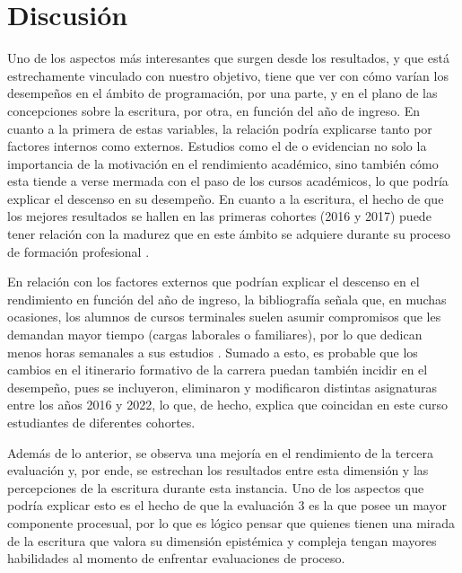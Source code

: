 \documentclass[spanish]{textolivre}
\begin{document}
\section{Discusión}
Uno de los aspectos más interesantes que surgen desde los resultados, y que está estrechamente vinculado con nuestro objetivo, tiene que ver con cómo varían los desempeños en el ámbito de programación, por una parte, y en el plano de las concepciones sobre la escritura, por otra, en función del año de ingreso. En cuanto a la primera de estas variables, la relación podría explicarse tanto por factores internos como externos. Estudios como el de \textcite{perez2005evolucion} o \textcite{garcia2021transformacion} evidencian no solo la importancia de la motivación en el rendimiento académico, sino también cómo esta tiende a verse mermada con el paso de los cursos académicos, lo que podría explicar el descenso en su desempeño. En cuanto a la escritura, el hecho de que los mejores resultados se hallen en las primeras cohortes (2016 y 2017) puede tener relación con la madurez que en este ámbito se adquiere durante su proceso de formación profesional \cite{valdesleon2022errores}.

En relación con los factores externos que podrían explicar el descenso en el rendimiento en función del año de ingreso, la bibliografía señala que, en muchas ocasiones, los alumnos de cursos terminales suelen asumir compromisos que les demandan mayor tiempo (cargas laborales o familiares), por lo que dedican menos horas semanales a sus estudios \cite{alcover2007analisis, xavier2022persistence}. Sumado a esto, es probable que los cambios en el itinerario formativo de la carrera puedan también incidir en el desempeño, pues se incluyeron, eliminaron y modificaron distintas asignaturas entre los años 2016 y 2022, lo que, de hecho, explica que coincidan en este curso estudiantes de diferentes cohortes.

Además de lo anterior, se observa una mejoría en el rendimiento de la tercera evaluación y, por ende, se estrechan los resultados entre esta dimensión y las percepciones de la escritura durante esta instancia. Uno de los aspectos que podría explicar esto es el hecho de que la evaluación 3 es la que posee un mayor componente procesual, por lo que es lógico pensar que quienes tienen una mirada de la escritura que valora su dimensión  epistémica y compleja tengan mayores habilidades al momento de enfrentar evaluaciones de proceso.  
\end{document}
